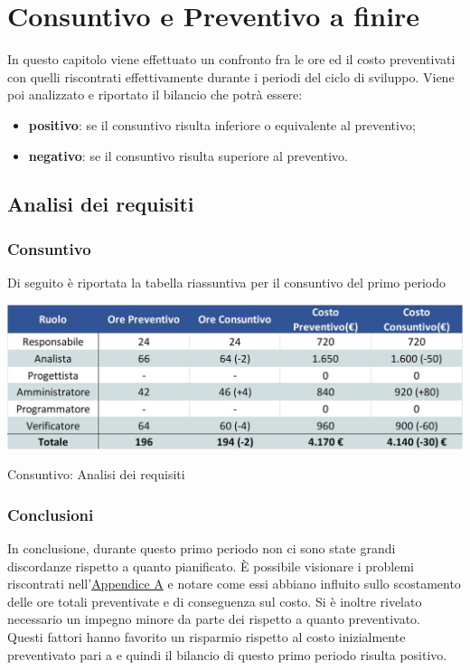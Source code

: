 \newpage
\section{Consuntivo e Preventivo a finire}

In questo capitolo viene effettuato un confronto fra le ore ed il costo preventivati con quelli riscontrati effettivamente durante i periodi del ciclo di sviluppo.
Viene poi analizzato e riportato il bilancio che potrà essere:
\begin{itemize}
	\item \textbf{positivo}: se il consuntivo risulta inferiore o equivalente al preventivo;
	\item \textbf{negativo}: se il consuntivo risulta superiore al preventivo.
\end{itemize}

\subsection{Analisi dei requisiti}
\subsubsection{Consuntivo}
Di seguito è riportata la tabella riassuntiva per il consuntivo del primo periodo
\begin{table}[h!]
	\centerline{\includegraphics[scale=0.55]{img/Preventivo/AnalisiRequisitiConsuntivo.jpg}}
	\caption{Consuntivo: Analisi dei requisiti}
\end{table}

\subsubsection{Conclusioni}
In conclusione, durante questo primo periodo non ci sono state grandi discordanze rispetto a quanto pianificato. È possibile visionare i problemi riscontrati nell'\hyperref[RiscontroRischi]{Appendice A} e notare come essi abbiano influito sullo scostamento delle ore totali preventivate e di conseguenza sul costo. Si è inoltre rivelato necessario un impegno minore da parte dei \vers{} rispetto a quanto preventivato.\\
Questi fattori hanno favorito un risparmio rispetto al costo inizialmente preventivato pari a  e quindi il bilancio di questo primo periodo risulta positivo.
